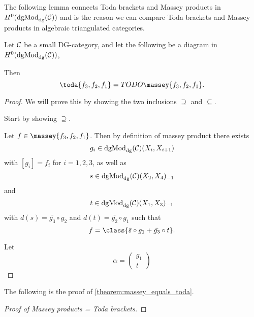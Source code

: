 

The following lemma connects Toda brackets and Massey products in \( H^0(\operatorname{dgMod}_{\operatorname{dg}}({\mathcal{C}})) \) and is the reason we can compare Toda brackets and Massey products in algebraic triangulated categories.

\begin{lemma}
    Let \( {\mathcal{C}} \) be a small DG-category, and let the following be a diagram in \( H^0(\operatorname{dgMod}_{\operatorname{dg}}({\mathcal{C}})) \),
    \begin{center}
    \end{center}
    Then
    \[
        \toda{f_3, f_2, f_1} = TODO\massey{f_3, f_2, f_1}.
    \]
\end{lemma}
\begin{proof}
    We will prove this by showing the two inclusions \( \supseteq \) and \( \subseteq \).

    Start by showing \( \supseteq \).

    Let \( f \in \massey{f_3, f_2, f_1} \). Then by definition of massey product there exists
    \[
        g_i \in \operatorname{dgMod}_{\operatorname{dg}}({\mathcal{C}})(X_i, X_{i + 1})
    \]
    with \( [g_i] = f_i \) for \( i = 1, 2, 3 \), as well as
    \[
        s \in \operatorname{dgMod}_{\operatorname{dg}}({\mathcal{C}})(X_2, X_4)_{-1}
    \]
    and
    \[
        t \in \operatorname{dgMod}_{\operatorname{dg}}({\mathcal{C}})(X_1, X_3)_{-1}
    \]
    with \( d(s) = \bar{g_3} \circ g_2 \) and \( d(t) = \bar{g_2} \circ g_1 \) such that
    \[
        f = \class{\bar{s} \circ g_1 + \bar{g_3} \circ t}.
    \]

    Let
    \[
        \alpha =
        \begin{pmatrix}
            g_1 \\
            t
        \end{pmatrix}
    \]
\end{proof}

The following is the proof of \autoref*{theorem:massey_equals_toda}.

\begin{proof}[Proof of Massey products = Toda brackets]
    
\end{proof}